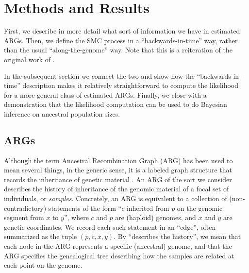 \documentclass{article}
\begin{document}
\section{Methods and Results}

First, 
we describe
in more detail what sort of information we have in estimated ARGs.
Then,
we define the SMC process in a ``backwards-in-time'' way,
rather than the usual ``along-the-genome'' way.
Note that this is a
reiteration of the original work of \citet{mcvean_approximating_2005}.

In the subsequent section we connect the two and
show how the ``backwards-in-time'' description
makes it relatively straightforward to compute the likelihood
for a more general class of estimated ARGs.
Finally, we close with a demonstration that the likelihood computation can be used
to do Bayesian inference on ancestral population sizes.

\subsection{ARGs} \label{par:recording}

Although the term Ancestral Recombination Graph (ARG) has been used to mean several things,
in the generic sense, it is a labeled graph structure that records
the inheritance of genetic material \citep{wong_general_2023}.
An ARG of the sort we consider describes the history of inheritance
of the genomic material of a focal set of individuals, or \emph{samples}.
Concretely, an ARG is equivalent to a collection of (non-contradictory) statements
of the form ``$c$ inherited from $p$ on the genomic segment from $x$ to $y$'',
where $c$ and $p$ are (haploid) genomes, and $x$ and $y$ are genetic coordinates.
We record each such statement in an ``edge'',
often summarized as the tuple $(p,c,x,y)$.
By ``describes the history'',
we mean that each node in the ARG represents a specific (ancestral) genome,
and that the ARG specifies the genealogical tree describing how the samples are related
at each point on the genome.
\end{document}
